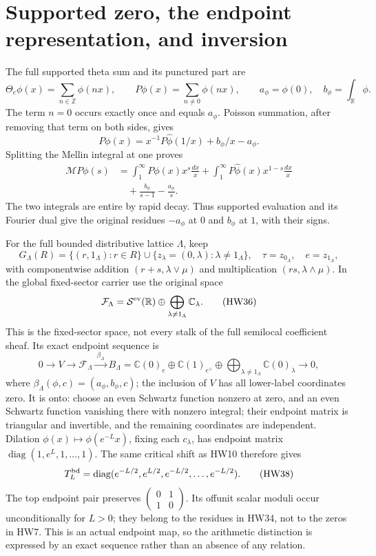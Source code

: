 \documentclass[11pt,a4paper]{article}
\theoremstyle{definition}\newtheorem{definition}[theorem]{Definition}
\newcommand{\Z}{\mathbb Z}\newcommand{\Q}{\mathbb Q}
\newcommand{\C}{\mathbb C}\newcommand{\R}{\mathbb R}
\providecommand{\M}{\mathcal M}
\begin{document}
\section{Supported zero, the endpoint representation, and inversion}

The full supported theta sum and its punctured part are
\[
 \Theta_e\phi(x)=\sum_{n\in\Z}\phi(nx),\qquad
 P\phi(x)=\sum_{n\ne0}\phi(nx),\qquad
 a_\phi=\phi(0),\quad b_\phi=\int_\R\phi.
 \tag{HW32}
\]
The term \(n=0\) occurs exactly once and equals \(a_\phi\).
Poisson summation, after removing that term on both sides, gives
\[
 P\phi(x)=x^{-1}P\widehat\phi(1/x)+b_\phi/x-a_\phi .
 \tag{HW33}
\]
Splitting the Mellin integral at one proves
\[
 \begin{split}
 \M P\phi(s)
  &=\int_1^\infty P\phi(x)x^s\frac{dx}{x}
    +\int_1^\infty P\widehat\phi(x)x^{1-s}\frac{dx}{x}\\
  &\quad+\frac{b_\phi}{s-1}-\frac{a_\phi}{s}.
 \end{split}
 \tag{HW34}
\]
The two integrals are entire by rapid decay. Thus supported
evaluation and its Fourier dual give the original residues
\(-a_\phi\) at \(0\) and \(b_\phi\) at \(1\), with their signs.

For the full bounded distributive lattice \(\Lambda\), keep
\[
 G_\Lambda(R)=\{(r,1_\Lambda):r\in R\}
       \cup\{z_\lambda=(0,\lambda):\lambda\ne1_\Lambda\},
 \quad \tau=z_{0_\Lambda},\quad e=z_{1_\Lambda},
 \tag{HW35}
\]
with componentwise addition \((r+s,\lambda\vee\mu)\) and
multiplication \((rs,\lambda\wedge\mu)\).
In the global fixed-sector carrier use the original space
\[
 \mathcal F_\Lambda=\mathcal S^{\rm ev}(\R)
          \oplus\bigoplus_{\lambda\ne1_\Lambda}\C_\lambda .
 \tag{HW36}
\]
This is the fixed-sector space, not every stalk of the full
semilocal coefficient sheaf. Its exact endpoint sequence is
\[
 0\longrightarrow V\longrightarrow\mathcal F_\Lambda
 \xrightarrow{\ \beta_\Lambda\ }
 B_\Lambda
 =\C(0)_e\oplus\C(1)_{e^\vee}
                  \oplus\bigoplus_{\lambda\ne1_\Lambda}\C(0)_\lambda
 \longrightarrow0,
 \tag{HW37}\label{hw:endpointseq}
\]
where \(\beta_\Lambda(\phi,c)=(a_\phi,b_\phi,c)\);
the inclusion of \(V\) has all lower-label coordinates zero.
It is onto: choose an even Schwartz function nonzero at zero,
and an even Schwartz function vanishing there with nonzero
integral; their endpoint matrix is triangular and invertible,
and the remaining coordinates are independent.
Dilation \(\phi(x)\mapsto\phi(e^{-L}x)\), fixing each \(c_\lambda\),
has endpoint matrix
\(\operatorname{diag}(1,e^L,1,\ldots,1)\).
The same critical shift as HW10 therefore gives
\[
 T_L^{\rm bd}
   =\operatorname{diag}(e^{-L/2},e^{L/2},
                                e^{-L/2},\ldots,e^{-L/2}).
 \tag{HW38}
\]
The top endpoint pair preserves
\(\left(\begin{smallmatrix}0&1\\1&0\end{smallmatrix}\right)\).
Its offunit scalar moduli occur unconditionally for \(L>0\);
they belong to the residues in HW34, not to the zeros in HW7.
This is an actual endpoint map, so the arithmetic distinction
is expressed by an exact sequence rather than an absence of
any relation.
\end{document}
